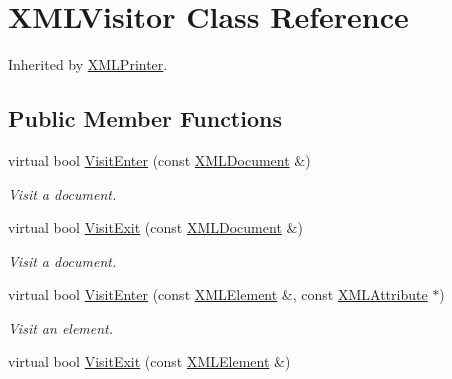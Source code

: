 \hypertarget{classtinyxml2_1_1_x_m_l_visitor}{\section{X\-M\-L\-Visitor Class Reference}
\label{classtinyxml2_1_1_x_m_l_visitor}
}


Inherited by \hyperlink{classtinyxml2_1_1_x_m_l_printer}{X\-M\-L\-Printer}.

\subsection*{Public Member Functions}
\begin{DoxyCompactItemize}
\item 
\hypertarget{classtinyxml2_1_1_x_m_l_visitor_a51dd012e994bb9560e7f225a146cb926}{virtual bool \hyperlink{classtinyxml2_1_1_x_m_l_visitor_a51dd012e994bb9560e7f225a146cb926}{Visit\-Enter} (const \hyperlink{classtinyxml2_1_1_x_m_l_document}{X\-M\-L\-Document} \&)}\label{classtinyxml2_1_1_x_m_l_visitor_a51dd012e994bb9560e7f225a146cb926}

\begin{DoxyCompactList}\small\item\em Visit a document. \end{DoxyCompactList}\item 
\hypertarget{classtinyxml2_1_1_x_m_l_visitor_aacbd61d4f7d629a11c8d7acb3f928a8c}{virtual bool \hyperlink{classtinyxml2_1_1_x_m_l_visitor_aacbd61d4f7d629a11c8d7acb3f928a8c}{Visit\-Exit} (const \hyperlink{classtinyxml2_1_1_x_m_l_document}{X\-M\-L\-Document} \&)}\label{classtinyxml2_1_1_x_m_l_visitor_aacbd61d4f7d629a11c8d7acb3f928a8c}

\begin{DoxyCompactList}\small\item\em Visit a document. \end{DoxyCompactList}\item 
\hypertarget{classtinyxml2_1_1_x_m_l_visitor_ac565e17387436d78d48c074ee70facef}{virtual bool \hyperlink{classtinyxml2_1_1_x_m_l_visitor_ac565e17387436d78d48c074ee70facef}{Visit\-Enter} (const \hyperlink{classtinyxml2_1_1_x_m_l_element}{X\-M\-L\-Element} \&, const \hyperlink{classtinyxml2_1_1_x_m_l_attribute}{X\-M\-L\-Attribute} $\ast$)}\label{classtinyxml2_1_1_x_m_l_visitor_ac565e17387436d78d48c074ee70facef}

\begin{DoxyCompactList}\small\item\em Visit an element. \end{DoxyCompactList}\item 
\hypertarget{classtinyxml2_1_1_x_m_l_visitor_ac35465c86ffc132f5ffbdc9fa63acb5a}{virtual bool \hyperlink{classtinyxml2_1_1_x_m_l_visitor_ac35465c86ffc132f5ffbdc9fa63acb5a}{Visit\-Exit} (const \hyperlink{classtinyxml2_1_1_x_m_l_element}{X\-M\-L\-Element} \&)}\label{classtinyxml2_1_1_x_m_l_visitor_ac35465c86ffc132f5ffbdc9fa63acb5a}


\end{DoxyCompactItemize}
